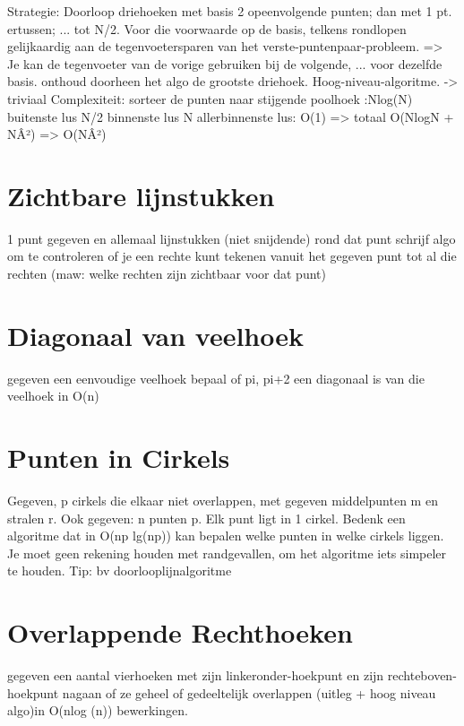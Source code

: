 \documentclass[12pt,a4paper]{article}
\begin{document}
Strategie:
        Doorloop driehoeken met basis 2 opeenvolgende punten; dan met 1 pt. ertussen; ... tot N/2.
        Voor die voorwaarde op de basis, telkens rondlopen gelijkaardig aan de tegenvoetersparen van het verste-puntenpaar-probleem. => Je kan de tegenvoeter van de vorige gebruiken bij de volgende, ... voor dezelfde basis.
        onthoud doorheen het algo de grootste driehoek. 
    Hoog-niveau-algoritme. -> triviaal
    Complexiteit:
        sorteer de punten naar stijgende poolhoek :Nlog(N)
        buitenste lus N/2
        binnenste lus N
        allerbinnenste lus: O(1)
        => totaal O(NlogN + NÂ²) => O(NÂ²) 





\section{Zichtbare lijnstukken}
1 punt gegeven en allemaal lijnstukken (niet snijdende) rond dat punt
schrijf algo om te controleren of je een rechte kunt tekenen vanuit het gegeven punt tot al die rechten
(maw: welke rechten zijn zichtbaar voor dat punt) 

\section{Diagonaal van veelhoek}
gegeven een eenvoudige veelhoek
bepaal of pi, pi+2 een diagonaal is van die veelhoek in O(n) 

\section{Punten in Cirkels}
Gegeven, p cirkels die elkaar niet overlappen, met gegeven middelpunten m en stralen r.
Ook gegeven: n punten p. Elk punt ligt in 1 cirkel.
Bedenk een algoritme dat in O(np lg(np)) kan bepalen welke punten in welke cirkels liggen.
Je moet geen rekening houden met randgevallen, om het algoritme iets simpeler te houden.
Tip: bv doorlooplijnalgoritme 

\section{Overlappende Rechthoeken}
gegeven een aantal vierhoeken met zijn linkeronder-hoekpunt en zijn rechteboven-hoekpunt nagaan of ze geheel of gedeeltelijk overlappen (uitleg + hoog niveau algo)in O(nlog (n)) bewerkingen. 


\fi
\end{document}
